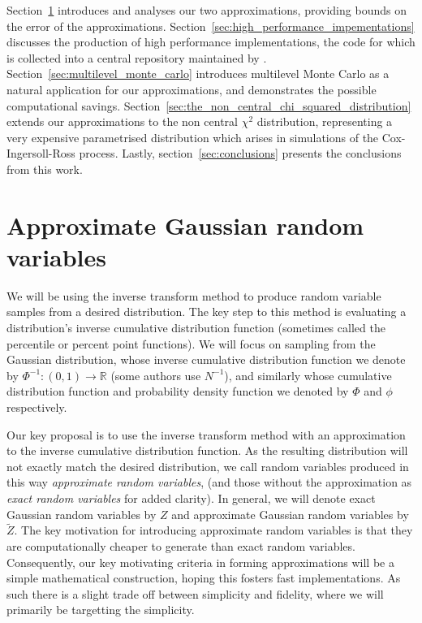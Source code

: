 \documentclass[manuscript,review]{acmart}
\begin{document}
Section~\ref{sec:approximate_gaussian_random_variables} introduces and analyses our two approximations, providing bounds on the error of the approximations. Section~\ref{sec:high_performance_impementations} discusses the production of high performance implementations, the code for which is collected into a central repository maintained by \citet{sheridan2020approximate_random,sheridan2020approximate_inverse}. Section~\ref{sec:multilevel_monte_carlo} introduces multilevel Monte Carlo as a natural application for our approximations, and demonstrates the possible computational savings. Section~\ref{sec:the_non_central_chi_squared_distribution} extends our approximations to the non central $ \chi^2 $ distribution, representing a very expensive parametrised distribution which arises in simulations of the Cox-Ingersoll-Ross process. Lastly, section~\ref{sec:conclusions} presents the conclusions from this work. 

\section{Approximate Gaussian random variables}
\label{sec:approximate_gaussian_random_variables}

We will be using the inverse transform method \citep[2.2.1]{glasserman2013monte} to produce random variable samples from a desired distribution. The key step to this method is evaluating a distribution's inverse cumulative distribution function (sometimes called the percentile or percent point functions). We will focus on sampling from the Gaussian distribution, whose inverse cumulative distribution function we denote by $ \Phi^{-1} \colon (0, 1) \to \mathbb{R} $ (some authors use $ N^{-1} $), and similarly whose cumulative distribution function and probability density function we denoted by $ \Phi $ and $ \phi $ respectively. 

Our key proposal is to use the inverse transform method with an approximation to the inverse cumulative distribution function. As the resulting distribution will not exactly match the desired distribution, we call random variables produced in this way \emph{approximate random variables}, (and those without the approximation as \emph{exact random variables} for added clarity). In general, we will denote exact Gaussian random variables by $ Z $ and approximate Gaussian random variables by $ \tilde{Z} $. The key motivation for introducing approximate random variables is that they are computationally cheaper to generate than exact random variables. Consequently, our key motivating criteria in forming approximations will be a simple mathematical construction, hoping this fosters fast implementations. As such there is a slight trade off between simplicity and fidelity, where we will primarily be targetting the simplicity. 
\end{document}
